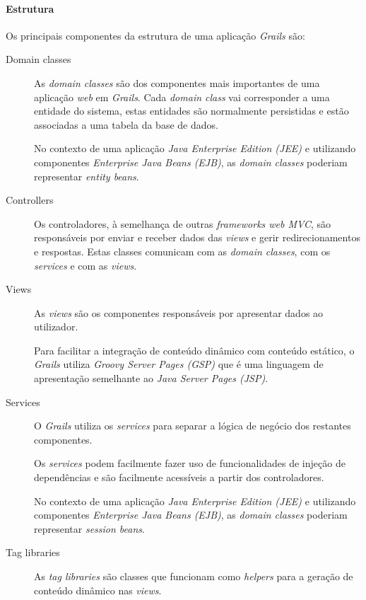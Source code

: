 \paragraph{Estrutura}

Os principais componentes da estrutura de uma aplicação \textit{Grails} são:

\begin{description}
  \item[Domain classes]

    As \textit{domain classes} são dos componentes mais importantes de uma aplicação \textit{web} em \textit{Grails}. Cada \textit{domain class} vai corresponder a uma entidade do sistema, estas entidades são normalmente persistidas e estão associadas a uma tabela da base de dados.

    No contexto de uma aplicação \textit{Java Enterprise Edition (JEE)} e utilizando componentes \textit{Enterprise Java Beans (EJB)}, as \textit{domain classes} poderiam representar \textit{entity beans}. 

  \item[Controllers]

    Os controladores, à semelhança de outras \textit{frameworks web MVC}, são responsáveis por enviar e receber dados das \textit{views} e gerir redirecionamentos e respostas. Estas classes comunicam com as \textit{domain classes}, com os \textit{services} e com as \textit{views}.

  \item[Views]

    As \textit{views} são os componentes responsáveis por apresentar dados ao utilizador.

    Para facilitar a integração de conteúdo dinâmico com conteúdo estático, o \textit{Grails} utiliza \textit{Groovy Server Pages (GSP)} que é uma linguagem de apresentação semelhante ao \textit{Java Server Pages (JSP)}.

  \item[Services]

    O \textit{Grails} utiliza os \textit{services} para separar a lógica de negócio dos restantes componentes.

    Os \textit{services} podem facilmente fazer uso de funcionalidades de injeção de dependências e são facilmente acessíveis a partir dos controladores.

    No contexto de uma aplicação \textit{Java Enterprise Edition (JEE)} e utilizando componentes \textit{Enterprise Java Beans (EJB)}, as \textit{domain classes} poderiam representar \textit{session beans}.  

  \item[Tag libraries]

    As \textit{tag libraries} são classes que funcionam como \textit{helpers} para a geração de conteúdo dinâmico nas \textit{views}.

\end{description}

